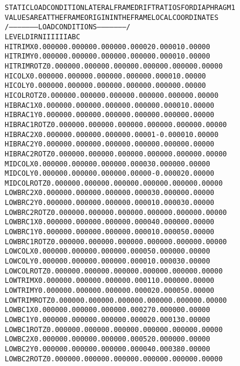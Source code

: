 \documentclass[12pt,notitle,letterpaper]{report}
\renewenvironment{quote}
  {\small\list{}{\rightmargin=0cm \leftmargin=0cm}%
   \item\relax}
  {\endlist}
\begin{document}
\begin{quote}
\begin{alltt}
STATIC LOAD CONDITION LATERAL FRAME DRIFT RATIOS  FOR DIAPHRAGM    1
VALUES ARE AT THE FRAME ORIGIN IN THE FRAME LOCAL COORDINATES
                /---------------------LOAD  CONDITIONS---------------------/
LEVEL     DIRN           I        II       III         A         B         C
HITRIM       X     0.00000   0.00000   0.00000   0.00002   0.00001   0.00000
HITRIM       Y     0.00000   0.00000   0.00000   0.00000   0.00001   0.00000
HITRIM    ROTZ     0.00000   0.00000   0.00000   0.00000   0.00000   0.00000
HICOL        X     0.00000   0.00000   0.00000   0.00000   0.00001   0.00000
HICOL        Y     0.00000   0.00000   0.00000   0.00000   0.00000   0.00000
HICOL     ROTZ     0.00000   0.00000   0.00000   0.00000   0.00000   0.00000
HIBRAC1      X     0.00000   0.00000   0.00000   0.00000   0.00001   0.00000
HIBRAC1      Y     0.00000   0.00000   0.00000   0.00000   0.00000   0.00000
HIBRAC1   ROTZ     0.00000   0.00000   0.00000   0.00000   0.00000   0.00000
HIBRAC2      X     0.00000   0.00000   0.00000   0.00001  -0.00001   0.00000
HIBRAC2      Y     0.00000   0.00000   0.00000   0.00000   0.00000   0.00000
HIBRAC2   ROTZ     0.00000   0.00000   0.00000   0.00000   0.00000   0.00000
MIDCOL       X     0.00000   0.00000   0.00000   0.00003   0.00000   0.00000
MIDCOL       Y     0.00000   0.00000   0.00000   0.00000  -0.00002   0.00000
MIDCOL    ROTZ     0.00000   0.00000   0.00000   0.00000   0.00000   0.00000
LOWBRC2      X     0.00000   0.00000   0.00000   0.00003   0.00000   0.00000
LOWBRC2      Y     0.00000   0.00000   0.00000   0.00001   0.00003   0.00000
LOWBRC2   ROTZ     0.00000   0.00000   0.00000   0.00000   0.00000   0.00000
LOWBRC1      X     0.00000   0.00000   0.00000   0.00004   0.00000   0.00000
LOWBRC1      Y     0.00000   0.00000   0.00000   0.00001   0.00005   0.00000
LOWBRC1   ROTZ     0.00000   0.00000   0.00000   0.00000   0.00000   0.00000
LOWCOL       X     0.00000   0.00000   0.00000   0.00005   0.00000   0.00000
LOWCOL       Y     0.00000   0.00000   0.00000   0.00001   0.00003   0.00000
LOWCOL    ROTZ     0.00000   0.00000   0.00000   0.00000   0.00000   0.00000
LOWTRIM      X     0.00000   0.00000   0.00000   0.00011   0.00000   0.00000
LOWTRIM      Y     0.00000   0.00000   0.00000   0.00002   0.00005   0.00000
LOWTRIM   ROTZ     0.00000   0.00000   0.00000   0.00000   0.00000   0.00000
LOWBC1       X     0.00000   0.00000   0.00000   0.00027   0.00000   0.00000
LOWBC1       Y     0.00000   0.00000   0.00000   0.00002   0.00013   0.00000
LOWBC1    ROTZ     0.00000   0.00000   0.00000   0.00000   0.00000   0.00000
LOWBC2       X     0.00000   0.00000   0.00000   0.00052   0.00000   0.00000
LOWBC2       Y     0.00000   0.00000   0.00000   0.00004   0.00038   0.00000
LOWBC2    ROTZ     0.00000   0.00000   0.00000   0.00000   0.00000   0.00000
\end{alltt}
\end{quote}
\end{document}
